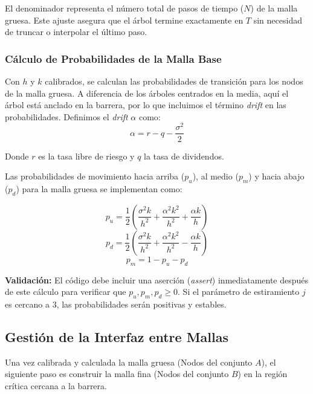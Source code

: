 El denominador representa el número total de pasos de tiempo ($N$) de la malla gruesa. Este ajuste asegura que el árbol termine exactamente en $T$ sin necesidad de truncar o interpolar el último paso.

\subsubsection{Cálculo de Probabilidades de la Malla Base} 

Con $h$ y $k$ calibrados, se calculan las probabilidades de transición para los nodos de la malla gruesa. A diferencia de los árboles centrados en la media, aquí el árbol está anclado en la barrera, por lo que incluimos el término \textit{drift} en las probabilidades.
Definimos el \textit{drift} $\alpha$ como: 
\begin{equation} 
  \alpha = r - q - \frac{\sigma^2}{2} 
\end{equation} 

Donde $r$ es la tasa libre de riesgo y $q$ la tasa de dividendos.

Las probabilidades de movimiento hacia arriba ($p_u$), al medio ($p_m$) y hacia abajo ($p_d$) para la malla gruesa se implementan como:

\begin{equation} 
  p_u = \frac{1}{2} \left( \frac{\sigma^2 k}{h^2} + \frac{\alpha^2 k^2}{h^2} + \frac{\alpha k}{h} \right) 
\end{equation}
\begin{equation} 
  p_d = \frac{1}{2} \left( \frac{\sigma^2 k}{h^2} + \frac{\alpha^2 k^2}{h^2} - \frac{\alpha k}{h} \right) 
\end{equation}
\begin{equation} 
  p_m = 1 - p_u - p_d 
\end{equation}

\textbf{Validación:} El código debe incluir una aserción (\textit{assert}) inmediatamente después de este cálculo para verificar que $p_u,p_m,p_d\ge0$. Si el parámetro de estiramiento $j$ es cercano a $3$, las probabilidades serán positivas y estables.

\subsection{Gestión de la Interfaz entre Mallas}

Una vez calibrada y calculada la malla gruesa (Nodos del conjunto $A$), el siguiente paso es construir la malla fina (Nodos del conjunto $B$) en la región crítica cercana a la barrera.

